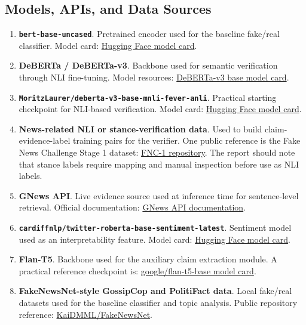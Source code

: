 \documentclass[11pt]{article}
\newcommand{\code}[1]{\texttt{#1}}
\begin{document}
\subsection{Models, APIs, and Data Sources}

\begin{enumerate}
    \item \textbf{\code{bert-base-uncased}}. Pretrained encoder used for the
    baseline fake/real classifier. Model card:
    \href{https://huggingface.co/google-bert/bert-base-uncased}{Hugging Face model card}.

    \item \textbf{DeBERTa / DeBERTa-v3}. Backbone used for semantic
    verification through NLI fine-tuning. Model resources:
    \href{https://huggingface.co/microsoft/deberta-v3-base}{DeBERTa-v3 base model card}.

    \item \textbf{\code{MoritzLaurer/deberta-v3-base-mnli-fever-anli}}.
    Practical starting checkpoint for NLI-based verification. Model card:
    \href{https://huggingface.co/MoritzLaurer/deberta-v3-base-mnli-fever-anli}{Hugging Face model card}.

    \item \textbf{News-related NLI or stance-verification data}. Used to build
    claim-evidence-label training pairs for the verifier. One public reference
    is the Fake News Challenge Stage 1 dataset:
    \href{https://github.com/FakeNewsChallenge/fnc-1}{FNC-1 repository}. The report should note that stance labels require mapping and manual inspection before use as NLI labels.

    \item \textbf{GNews API}. Live evidence source used at inference time for
    sentence-level retrieval. Official documentation:
    \href{https://docs.gnews.io/}{GNews API documentation}.

    \item \textbf{\code{cardiffnlp/twitter-roberta-base-sentiment-latest}}.
    Sentiment model used as an interpretability feature. Model card:
    \href{https://huggingface.co/cardiffnlp/twitter-roberta-base-sentiment-latest}{Hugging Face model card}.

    \item \textbf{Flan-T5}. Backbone used for the auxiliary claim extraction
    module. A practical reference checkpoint is:
    \href{https://huggingface.co/google/flan-t5-base}{google/flan-t5-base model card}.

    \item \textbf{FakeNewsNet-style GossipCop and PolitiFact data}. Local
    fake/real datasets used for the baseline classifier and topic analysis.
    Public repository reference:
    \href{https://github.com/KaiDMML/FakeNewsNet}{KaiDMML/FakeNewsNet}.
\end{enumerate}
\end{document}

